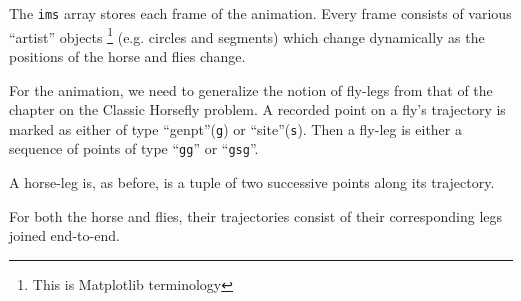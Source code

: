 \documentclass[11.5pt]{report}
\begin{document}
\vspace{-0.8cm} \newchunk The \verb|ims| array stores each frame of the animation. Every frame consists of 
various ``artist'' objects \footnote{This is Matplotlib terminology} (e.g. circles and segments) 
which change dynamically as the positions of the horse and flies change. 

For the animation, we need to generalize the notion of fly-legs from that of the chapter on the Classic
Horsefly problem. A recorded point on a fly's trajectory is marked as either of type ``genpt''(\verb|g|) 
or ``site''(\verb|s|). Then a fly-leg is either a sequence of points of type ``\verb|gg|'' or ``\verb|gsg|''.  

A horse-leg is, as before, is  a tuple of two successive points along its trajectory. 

For both the horse and flies, their trajectories consist of their corresponding legs joined end-to-end. 

\end{document}
